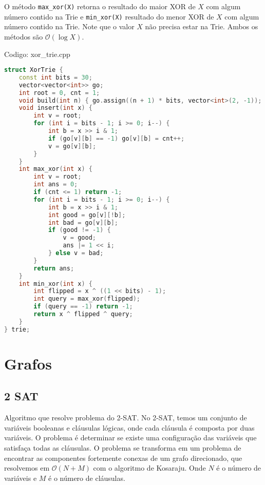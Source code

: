 \documentclass[10pt, a4paper, oneside]{book}
\begin{document}
O método \texttt{max\_xor(X)} retorna o resultado do maior XOR de $X$ com algum número contido na Trie e \texttt{min\_xor(X)} resultado do menor XOR de $X$ com algum número contido na Trie. Note que o valor $X$ não precisa estar na Trie. Ambos os métodos são $\mathcal{O}(\log X)$.

\hfill

Codigo: xor\_trie.cpp

\begin{lstlisting}[language=C++]
struct XorTrie {
    const int bits = 30;
    vector<vector<int>> go;
    int root = 0, cnt = 1;
    void build(int n) { go.assign((n + 1) * bits, vector<int>(2, -1)); }
    void insert(int x) {
        int v = root;
        for (int i = bits - 1; i >= 0; i--) {
            int b = x >> i & 1;
            if (go[v][b] == -1) go[v][b] = cnt++;
            v = go[v][b];
        }
    }
    int max_xor(int x) {
        int v = root;
        int ans = 0;
        if (cnt <= 1) return -1;
        for (int i = bits - 1; i >= 0; i--) {
            int b = x >> i & 1;
            int good = go[v][!b];
            int bad = go[v][b];
            if (good != -1) {
                v = good;
                ans |= 1 << i;
            } else v = bad;
        }
        return ans;
    }
    int min_xor(int x) {
        int flipped = x ^ ((1 << bits) - 1);
        int query = max_xor(flipped);
        if (query == -1) return -1;
        return x ^ flipped ^ query;
    }
} trie;
\end{lstlisting}
\hfill

\newpage

%
%
%
%

\chapter{Grafos}

\section{2 SAT}


Algoritmo que resolve problema do 2-SAT. No 2-SAT, temos um conjunto de variáveis booleanas e cláusulas lógicas, onde cada cláusula é composta por duas variáveis. O problema é determinar se existe uma configuração das variáveis que satisfaça todas as cláusulas. O problema se transforma em um problema de encontrar as componentes fortemente conexas de um grafo direcionado, que resolvemos em $\mathcal{O}(N + M)$ com o algoritmo de Kosaraju. Onde $N$ é o número de variáveis e $M$ é o número de cláusulas.  
\end{document}
